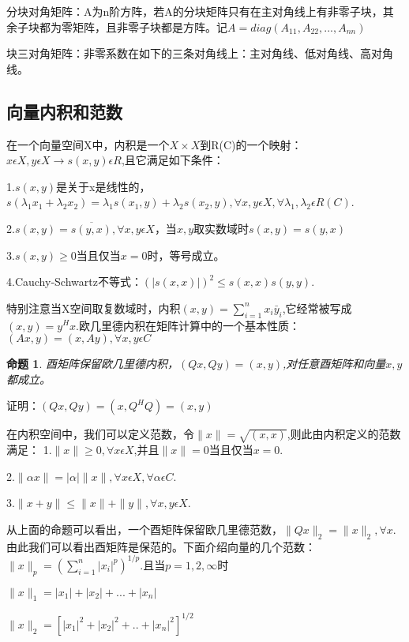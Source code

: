 \documentclass{article}
\begin{document}
分块对角矩阵：A为n阶方阵，若A的分块矩阵只有在主对角线上有非零子块，其余子块都为零矩阵，且非零子块都是方阵。记$A=diag(A_{11},A_{22},...,A_{nn})$

块三对角矩阵：非零系数在如下的三条对角线上：主对角线、低对角线、高对角线。
\subsection{向量内积和范数}
在一个向量空间X中，内积是一个$X\times X$到R(C)的一个映射：$x\epsilon X,y\epsilon X \longrightarrow s(x,y)\epsilon R $,且它满足如下条件：

1.$s(x,y)$是关于x是线性的，$s(\lambda _1 x_1+\lambda _2 x_2)=\lambda _1 s(x_1,y)+\lambda _2 s(x_2,y),\forall x,y\epsilon X,\forall \lambda _1 ,\lambda _2 \epsilon R(C)$.

2.$s(x,y)=\overline{s(y,x)},\forall x,y\epsilon X$，当$x,y$取实数域时$s(x,y)=s(y,x)$

3.$s(x,y)\ge 0$当且仅当$x=0$时，等号成立。

4.Cauchy-Schwartz不等式：$(\vert s(x,x)\vert)^2\leqslant s(x,x)s(y,y)$.

特别注意当X空间取复数域时，内积$(x,y)=\sum_{i=1}^n x_i\bar{y}_i$,它经常被写成$(x,y)=y^Hx$.欧几里德内积在矩阵计算中的一个基本性质：$(Ax,y)=(x,Ay),\forall x,y\epsilon C$

\newtheorem{thm}{命题}
\begin{thm}
酉矩阵保留欧几里德内积，$(Qx,Qy)=(x,y)$,对任意酉矩阵和向量$x,y$都成立。
\end{thm}

证明：$(Qx,Qy)=(x,Q^HQ)=(x,y)$

在内积空间中，我们可以定义范数，令$\parallel x\parallel=\sqrt{(x,x)}$,则此由内积定义的范数满足：
1.$\parallel x\parallel \ge 0,\forall x\epsilon X$,并且$\parallel x\parallel=0$当且仅当$x=0$.

2.$\parallel \alpha x\parallel =|\alpha| \parallel x\parallel,\forall x\epsilon X,\forall \alpha \epsilon C$.

3.$\parallel x+y \parallel \leqslant \parallel x\parallel + \parallel y\parallel ,\forall x,y\epsilon X$.

从上面的命题可以看出，一个酉矩阵保留欧几里德范数，$\parallel Qx \parallel_2=\parallel x \parallel_2,\forall x$.由此我们可以看出酉矩阵是保范的。下面介绍向量的几个范数：
$\parallel x \parallel_p=(\sum_{i=1}^n |x_i|^p)^{1/p}$.且当$p=1,2,\infty$时

$\parallel x \parallel_1=|x_1|+|x_2|+...+|x_n|$

$\parallel x \parallel_2=[|x_1|^2+|x_2|^2+..+|x_n|^2]^{1/2}$
\end{document}
